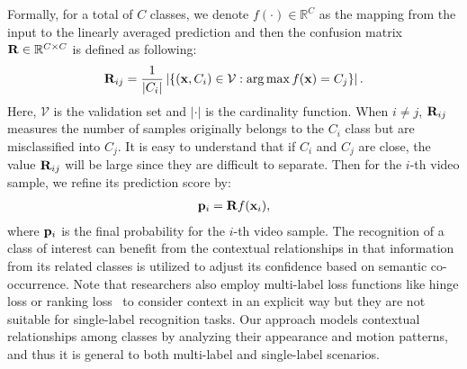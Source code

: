 \documentclass[journal]{IEEEtran}
\begin{document}
Formally, for a total of $C$ classes, we denote $f(\cdot) \in \mathbb{R}^{C}$ as the mapping from the input to the linearly averaged prediction and then the confusion matrix ${\bf R} \in \mathbb{R}^{C \times C}$ is defined as following:
\begin{align}{\bf R}_{ij}  = \frac{1}{|C_i|}\left| \left\{ ({\bf x}, {C_i})  \in \mathcal{V}: \arg\max f({\bf x)} = C_j  \right\} \right|.
\label{eq:confusionmatrix}
\end{align} 
Here, $\mathcal{V}$ is the validation set and $\left| \cdot \right|$ is the cardinality function. When $i \neq j$, ${\bf R}_{ij}$ measures 
the number of samples originally belongs to the $C_i$ class but are misclassified into $C_j$. It is easy to understand that if $C_i$ and $C_j$ are close, the value ${\bf R}_{ij}$ will be large since they are difficult to separate. Then for the $i$-th video sample, we refine its prediction score by:
\begin{align}{\bf p}_i = {\bf R}f({\bf x}_i),
\label{eq:refine}
\end{align}
where ${\bf p}_i$ is the final probability for the $i$-th video sample. The recognition of a class of interest can benefit from the contextual relationships in that information from its related classes is utilized to adjust its confidence based on semantic co-occurrence. {\color{black} Note that researchers also employ multi-label loss functions like hinge loss or ranking loss~\cite{Chatfield14} to consider context in an explicit way but they are not suitable for single-label recognition tasks. Our approach models contextual relationships among classes by analyzing their appearance and motion patterns, and thus it is general to both multi-label and single-label scenarios.}
\end{document}
